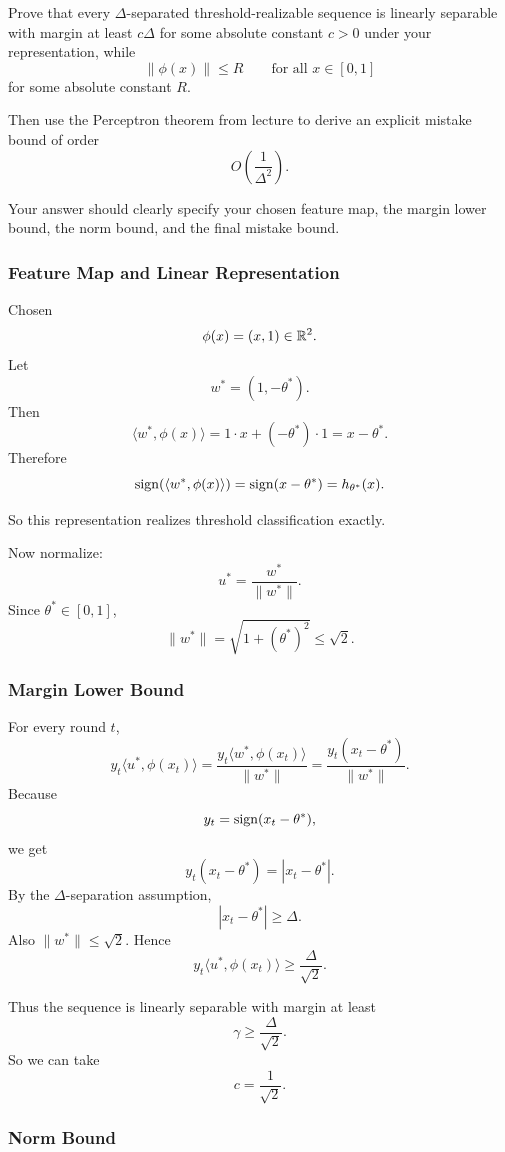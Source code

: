 \documentclass{article}
\begin{document}
Prove that every $\Delta$-separated threshold-realizable sequence is linearly
separable with margin at least $c\Delta$ for some absolute constant $c>0$
under your representation, while
\[
\|\phi(x)\|\le R
\qquad \text{for all } x\in [0,1]
\]
for some absolute constant $R$.

Then use the Perceptron theorem from lecture to derive an explicit mistake
bound of order
\[
O\!\left(\frac{1}{\Delta^2}\right).
\]

Your answer should clearly specify your chosen feature map, the margin lower
bound, the norm bound, and the final mistake bound.

\begin{solutionbox}

\subsubsection{Feature Map and Linear Representation}

Chosen
\[
\phi(x)=(x,1)\in \mathbb{R}^2.
\]
Let
\[
w^*=(1,-\theta^*).
\]
Then
\[
\langle w^*,\phi(x)\rangle
=
1\cdot x + (-\theta^*)\cdot 1
=
x-\theta^*.
\]
Therefore
\[
\operatorname{sign}(\langle w^*,\phi(x)\rangle)
=
\operatorname{sign}(x-\theta^*)
=
h_{\theta^*}(x).
\]

So this representation realizes threshold classification exactly.

Now normalize:
\[
u^*=\frac{w^*}{\|w^*\|}.
\]
Since $\theta^*\in[0,1]$,
\[
\|w^*\|
=
\sqrt{1+(\theta^*)^2}
\le
\sqrt{2}.
\]

\subsubsection{Margin Lower Bound}

For every round $t$,
\[
y_t\langle u^*,\phi(x_t)\rangle
=
\frac{y_t\langle w^*,\phi(x_t)\rangle}{\|w^*\|}
=
\frac{y_t(x_t-\theta^*)}{\|w^*\|}.
\]
Because
\[
y_t=\operatorname{sign}(x_t-\theta^*),
\]
we get
\[
y_t(x_t-\theta^*) = |x_t-\theta^*|.
\]
By the $\Delta$-separation assumption,
\[
|x_t-\theta^*| \ge \Delta.
\]
Also $\|w^*\|\le \sqrt{2}$. Hence
\[
y_t\langle u^*,\phi(x_t)\rangle
\ge
\frac{\Delta}{\sqrt{2}}.
\]

Thus the sequence is linearly separable with margin at least
\[
\gamma \ge \frac{\Delta}{\sqrt{2}}.
\]
So we can take
\[
c=\frac{1}{\sqrt{2}}.
\]

\subsubsection{Norm Bound}


\end{solutionbox}
\end{document}
